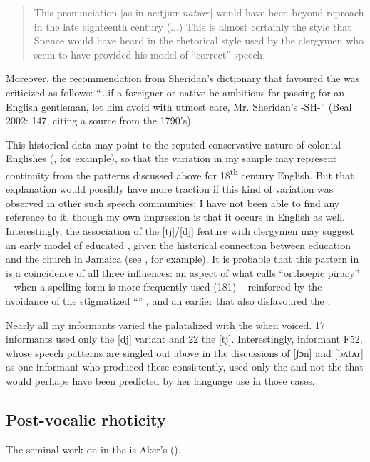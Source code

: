 \begin{quote}
	This pronunciation [as in ne:tju:r \textit{nature}] would have been beyond reproach in the late eighteenth century (...) This is almost certainly the style that Spence would have heard in the rhetorical style used by the clergymen who seem to have provided his model of ``correct'' speech.
\end{quote}

Moreover, the recommendation from Sheridan’s dictionary that favoured the  was criticized as follows: “...if a foreigner or native be ambitious for passing for an English gentleman, let him avoid with utmost care, Mr. Sheridan’s -SH-” (Beal 2002: 147, citing a source from the 1790's).

This historical data may point to the reputed conservative nature of colonial Englishes (\citealt[84]{Fisher2001}, for example), so that the variation in my sample may represent continuity from the patterns discussed above for 18\textsuperscript{th} century English.  But that explanation would possibly have more traction if this kind of variation was observed in other such speech communities; I have not been able to find any reference to it, though my own impression is that it occurs in  English as well.  Interestingly, the association of the [tj]/[dj] feature with clergymen may suggest an early model of educated , given the historical connection between education and the church in Jamaica (see \citealt[262]{Campbell1996}, for example).  It is probable that this pattern in  is a coincidence of all three influences: an aspect of what \citet{Coye1998} calls “orthoepic piracy” – when a spelling form is more frequently used (181) – reinforced by the avoidance of the stigmatized “” , and an earlier  that also disfavoured the .  

Nearly all my informants varied the palatalized  with the  when voiced.  17 informants used only the [dj] variant and 22 the [tj].  Interestingly, informant F52, whose speech patterns are singled out above in the discussions of [ʃɔn] and [bʌtʌr] as one informant who produced these consistently, used only the  and not the  that would perhaps have been predicted by her language use in those cases.  

\subsection{Post-vocalic rhoticity}%
The seminal work on  in the  is Aker’s  ().

